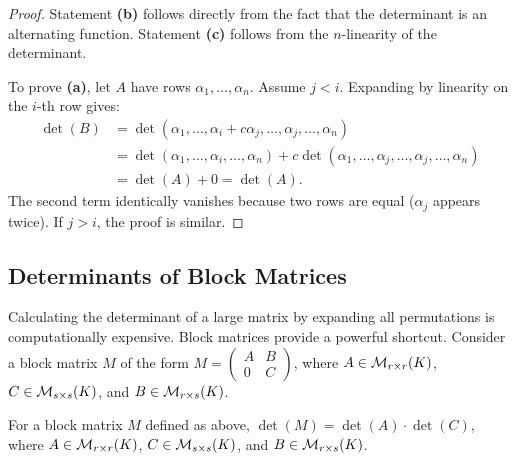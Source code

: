 \begin{proof}
  Statement \textbf{(b)} follows directly from the fact that the determinant is an alternating function. Statement \textbf{(c)} follows from the $n$-linearity of the determinant.

  To prove \textbf{(a)}, let $A$ have rows $\alpha_1, \dots, \alpha_n$. Assume $j < i$. Expanding by linearity on the $i$-th row gives:
  \begin{align*}
    \det(B) &= \det(\alpha_1, \dots, \alpha_i + c\alpha_j, \dots, \alpha_j, \dots, \alpha_n) \\
    &= \det(\alpha_1, \dots, \alpha_i, \dots, \alpha_n) + c \det(\alpha_1, \dots, \alpha_j, \dots, \alpha_j, \dots, \alpha_n) \\
    &= \det(A) + 0 = \det(A).
  \end{align*}
  The second term identically vanishes because two rows are equal ($\alpha_j$ appears twice). If $j > i$, the proof is similar.
\end{proof}

\subsection{Determinants of Block Matrices}

Calculating the determinant of a large matrix by expanding all permutations is computationally expensive. Block matrices provide a powerful shortcut. Consider a block matrix $M$ of the form $M = \left(\begin{smallmatrix} A & B \\ 0 & C \end{smallmatrix}\right)$, where $A \in \mathcal{M}_{r \times r}(K)$, $C \in \mathcal{M}_{s \times s}(K)$, and $B \in \mathcal{M}_{r \times s}(K)$.

\begin{proposition}
  \label{prop:block_matrix}
  For a block matrix $M$ defined as above, $\det(M) = \det(A) \cdot \det(C)$, where $A \in \mathcal{M}_{r \times r}(K)$, $C \in \mathcal{M}_{s \times s}(K)$, and $B \in \mathcal{M}_{r \times s}(K)$.
\end{proposition}

